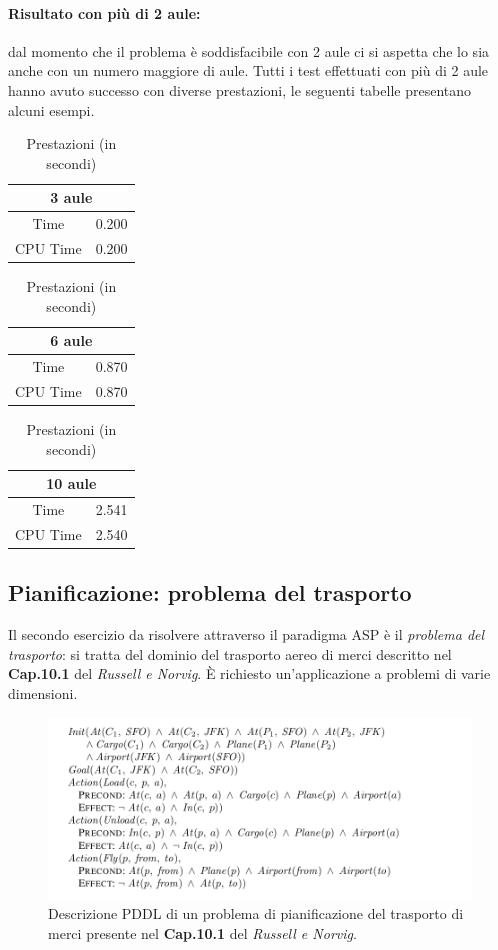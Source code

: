 \documentclass[a4paper,oneside,12pt]{book}
\begin{document}
	\paragraph{Risultato con più di 2 aule:} dal momento che il problema è soddisfacibile con 2 aule ci si aspetta che lo sia anche con un numero maggiore di aule. Tutti i test effettuati con più di 2 aule hanno avuto successo con diverse  prestazioni, le seguenti tabelle presentano alcuni esempi.
	\FloatBarrier
	\begin{table}[h]
		\centering
		\begin{tabular}{|c | c|}
			\multicolumn{2}{c}{\textbf{3 aule}}\\
			\hline
			Time &0.200\\
			\hline
			CPU Time &0.200\\
			\hline
		\end{tabular}
		\centering
		\begin{tabular}{|c | c|}
			\multicolumn{2}{c}{\textbf{6 aule}}\\
			\hline
			Time &0.870\\
			\hline
			CPU Time &0.870\\
			\hline
		\end{tabular}
		\centering
		\begin{tabular}{|c | c|}
			\multicolumn{2}{c}{\textbf{10 aule}}\\
			\hline
			Time &2.541\\
			\hline
			CPU Time &2.540\\
			\hline
		\end{tabular}
		\caption{Prestazioni (in secondi)}
	\end{table}
	\FloatBarrier
	\newpage
	\subsection*{Pianificazione: problema del trasporto}
	Il secondo esercizio da risolvere attraverso il paradigma ASP è il \textit{problema del trasporto}:
	si tratta del dominio del trasporto aereo di merci descritto nel \textbf{Cap.10.1} del
	\textit{Russell e Norvig}.
	È richiesto un'applicazione a problemi di varie dimensioni.
	\begin{figure}[h!]
		\includegraphics[scale=0.5]{cargo.png}
		\caption{Descrizione PDDL di un problema di pianificazione del trasporto di merci
		presente nel \textbf{Cap.10.1} del \textit{Russell e Norvig}.}
		\label{fig:birds}
	\end{figure}
\end{document}
